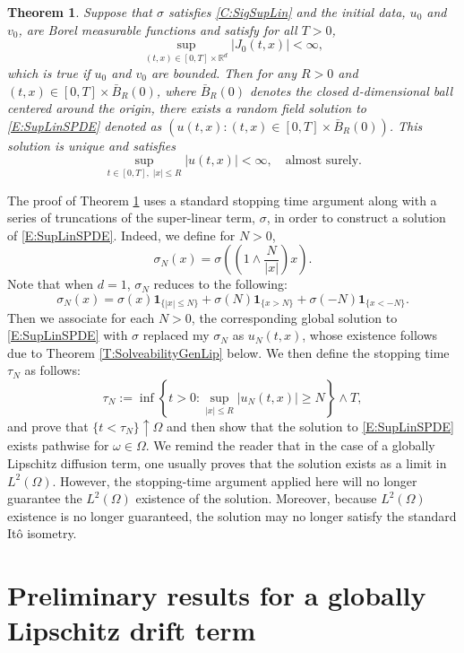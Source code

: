\documentclass[a4paper,11pt]{article}
\numberwithin{equation}{section}
\theoremstyle{plain}
\newtheorem{theorem}{Theorem}[section]
\theoremstyle{definition}
\newcommand{\Ito}{It\^{o} }
\newcommand{\R}{\mathbb{R}}
\numberwithin{NQ}{section}
\numberwithin{LQ}{section}
\numberwithin{ZQ}{section}
\begin{document}
\begin{theorem} \label{T:MainSupLin}
  Suppose that $\sigma$ satisfies \eqref{C:SigSupLin} and the initial data, $u_0$ and $v_0$, are
  Borel measurable functions and satisfy for all $T>0$,
  \[
    \sup_{(t, x) \in [0,T] \times \R^d} |J_0(t,x)| < \infty,
  \]
   which is true if $u_0$ and $v_0$ are bounded. Then for any $R>0$ and $(t,x) \in [0,T] \times
   \bar{B}_R(0)$, where $\bar{B}_R(0)$ denotes the closed $d$-dimensional ball centered around the
   origin, there exists a random field solution to \eqref{E:SupLinSPDE} denoted as $(u(t,x): (t,x)
   \in [0,T] \times \bar{B}_R(0))$. This solution is unique and satisfies
  \begin{equation}
    \sup_{t\in[0,T],\; |x| \le R} |u(t,x)| < \infty, \quad \text{almost surely.}
  \end{equation}
\end{theorem}

The proof of Theorem \ref{T:MainSupLin} uses a standard stopping time argument along with a series
of truncations of the super-linear term, $\sigma$, in order to construct a solution of
\eqref{E:SupLinSPDE}. Indeed, we define for $ N >0$,
\[
    \sigma_N(x) = \sigma\left( \left(1 \wedge \frac{N}{|x|}\right) x \right).
\]
Note that when $d = 1$, $\sigma_N$ reduces to the following:
\[
  \sigma_N(x) = \sigma(x) \mathbf{1}_{\{ |x| \le N \}} + \sigma(N)\mathbf{1}_{ \{ x > N \}} + \sigma(-N)\mathbf{1}_{\{ x < -N\}}.
\]
Then we associate for each $N>0$, the corresponding global solution to \eqref{E:SupLinSPDE} with
$\sigma$ replaced my $\sigma_N$ as $u_N(t,x)$, whose existence follows due to Theorem
\ref{T:SolveabilityGenLip} below. We then define the stopping time $\tau_N$ as follows:
\[
\tau_N := \inf \left\{ t>0 : \sup_{|x| \le R} |u_N(t,x)| \ge N \right\} \wedge T,
\]
and prove that $\{t < \tau_N\} \uparrow \Omega$ and then show that the solution to
\eqref{E:SupLinSPDE} exists pathwise for $\omega \in \Omega$. We remind the reader that in the case
of a globally Lipschitz diffusion term, one usually proves that the solution exists as a limit in
$L^2(\Omega)$. However, the stopping-time argument applied here will no longer guarantee the
$L^2(\Omega)$ existence of the solution. Moreover, because $L^2(\Omega)$ existence is no longer
guaranteed, the solution may no longer satisfy the standard \Ito isometry.

\section{Preliminary results for a globally Lipschitz drift term}
\end{document}
